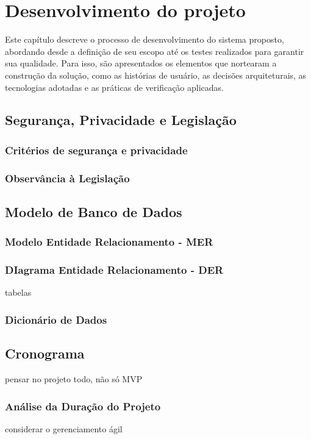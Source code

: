 	\chapter{Desenvolvimento do projeto}

	Este capítulo descreve o processo de desenvolvimento do sistema proposto, abordando desde a definição de seu escopo até os testes realizados para garantir sua qualidade. Para isso, são apresentados os elementos que nortearam a construção da solução, como as histórias de usuário, as decisões arquiteturais, as tecnologias adotadas e as práticas de verificação aplicadas.
	
	
	
	
	
	
	

	\section{Segurança, Privacidade e Legislação}
	\subsection{Critérios de segurança e privacidade}
	\subsection{Observância à Legislação}
	\section{Modelo de Banco de Dados}
	\subsection{Modelo Entidade Relacionamento - MER}
	\subsection{DIagrama Entidade Relacionamento - DER}
	tabelas
	\subsection{Dicionário de Dados}
	\section{Cronograma}
	pensar no projeto todo, não só MVP
	\subsection{Análise da Duração do Projeto}
	considerar o gerenciamento ágil